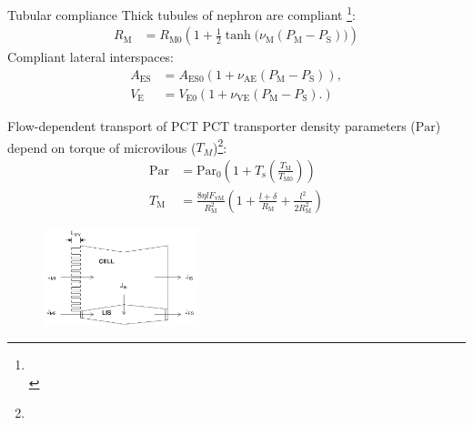 \documentclass[serif]{beamer}
\begin{document}
\begin{frame}{Tubular compliance}
    Thick tubules of nephron are compliant \citep{Weinstein2007,Weinstein2015}\footnote[frame,1]{\tiny{\\ }}:
    \begin{align}
        R_\mathrm{M}&=R_{\mathrm{M}0}\left(1+\frac{1}{2}\tanh\big(\nu_\mathrm{M}(P_\mathrm{M}-P_\mathrm{S})\big)\right)
    \end{align}
    Compliant lateral interspaces:
    \begin{align}
        A_\mathrm{ES} &=A_{\mathrm{ES}0}\left(1+\nu_\mathrm{AE}(P_\mathrm{M}-P_\mathrm{S})\right),\\
        V_\mathrm{E} &=V_{\mathrm{E}0}\left(1+\nu_\mathrm{VE}(P_\mathrm{M}-P_\mathrm{S}).\right)
    \end{align}
\end{frame}

\begin{frame}{Flow-dependent transport of PCT}
    PCT transporter density parameters ($\mathrm{Par}$) depend on torque of microvilous ($T_M$)\citep{Weinstein2007}\footnote[frame,1]{\tiny{}}:
    \begin{align}
        \mathrm{Par} &= \mathrm{Par}_0\left(1+T_\mathrm{s}\left(\frac{T_\mathrm{M}}{T_{\mathrm{M}0}}\right)\right)\\
        T_\mathrm{M} &= \frac{8\eta l F_{\mathrm{vM}}}{R_\mathrm{M}^2}\left(1+\frac{l+\delta}{R_\mathrm{M}}+\frac{l^2}{2R^2_\mathrm{M}}\right)
    \end{align}
    \begin{figure}
        \centering
        \includegraphics[width=0.4\textwidth]{figures/PCT_epithelium.png}
    \end{figure}
\end{frame}
\end{document}
